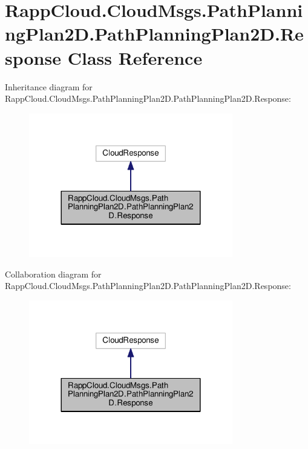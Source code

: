\hypertarget{classRappCloud_1_1CloudMsgs_1_1PathPlanningPlan2D_1_1PathPlanningPlan2D_1_1Response}{\section{Rapp\-Cloud.\-Cloud\-Msgs.\-Path\-Planning\-Plan2\-D.\-Path\-Planning\-Plan2\-D.\-Response Class Reference}
\label{classRappCloud_1_1CloudMsgs_1_1PathPlanningPlan2D_1_1PathPlanningPlan2D_1_1Response}
}


Inheritance diagram for Rapp\-Cloud.\-Cloud\-Msgs.\-Path\-Planning\-Plan2\-D.\-Path\-Planning\-Plan2\-D.\-Response\-:
\nopagebreak
\begin{figure}[H]
\begin{center}
\leavevmode
\includegraphics[width=252pt]{classRappCloud_1_1CloudMsgs_1_1PathPlanningPlan2D_1_1PathPlanningPlan2D_1_1Response__inherit__graph}
\end{center}
\end{figure}


Collaboration diagram for Rapp\-Cloud.\-Cloud\-Msgs.\-Path\-Planning\-Plan2\-D.\-Path\-Planning\-Plan2\-D.\-Response\-:
\nopagebreak
\begin{figure}[H]
\begin{center}
\leavevmode
\includegraphics[width=252pt]{classRappCloud_1_1CloudMsgs_1_1PathPlanningPlan2D_1_1PathPlanningPlan2D_1_1Response__coll__graph}
\end{center}
\end{figure}
